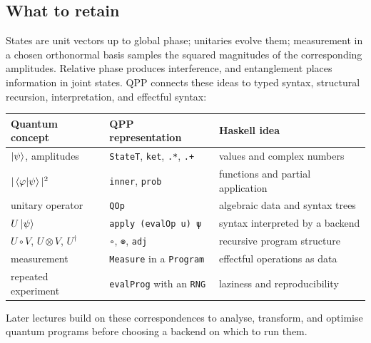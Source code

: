 \documentclass[11pt,a4paper]{article}
\theoremstyle{definition}
\begin{document}
\begin{samepage}
\section{What to retain}

States are unit vectors up to global phase; unitaries evolve them; measurement
in a chosen orthonormal basis samples the squared magnitudes of the
corresponding amplitudes.  Relative phase produces interference, and
entanglement places information in joint states.  QPP connects these ideas to
typed syntax, structural recursion, interpretation, and effectful syntax:

\begin{center}
\small
\begin{tabular}{p{}p{}p{}}
Quantum concept & QPP representation & Haskell idea \\
\hline
$\left| \psi \right\rangle$, amplitudes & \lstinline|StateT|, \lstinline|ket|, \lstinline|.*|, \lstinline|.+| & values and complex numbers \\
$|\left\langle \varphi \middle| \psi \right\rangle|^2$ & \lstinline|inner|, \lstinline|prob| & functions and partial application \\
unitary operator & \lstinline|QOp| & algebraic data and syntax trees \\
$U\left| \psi \right\rangle$ & \lstinline|apply (evalOp u) ψ| & syntax interpreted by a backend \\
$U\circ V$, $U\otimes V$, $U^\dagger$ & \lstinline|∘|, \lstinline|⊗|, \lstinline|adj| & recursive program structure \\
measurement & \lstinline|Measure| in a \lstinline|Program| & effectful operations as data \\
repeated experiment & \lstinline|evalProg| with an \lstinline|RNG| & laziness and reproducibility
\end{tabular}
\end{center}

Later lectures build on these correspondences to analyse, transform, and
optimise quantum programs before choosing a backend on which to run them.
\end{samepage}
\end{document}

